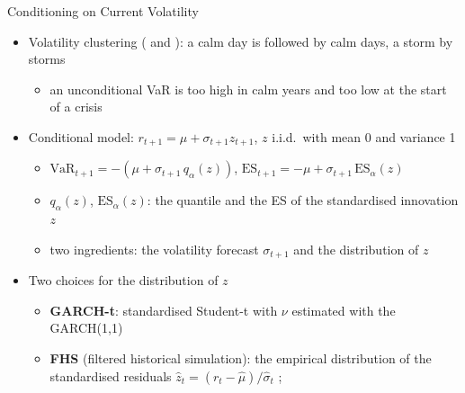 \begin{frame}{Conditioning on Current Volatility}
\itemsize{\footnotesize}
\begin{itemize}
    \item Volatility clustering ( and ): a calm day is followed by calm days, a storm by storms
    \begin{itemize}
        \item an unconditional VaR is too high in calm years and too low at the start of a crisis
    \end{itemize}
    \item Conditional model: $r_{t+1} = \mu + \sigma_{t+1}z_{t+1}$, $z$ i.i.d.\ with mean 0 and variance 1
    \begin{itemize}
        \item $\mathrm{VaR}_{t+1} = -(\mu + \sigma_{t+1}\,q_\alpha(z))$, \quad $\mathrm{ES}_{t+1} = -\mu + \sigma_{t+1}\,\mathrm{ES}_\alpha(z)$
        \item $q_\alpha(z)$, $\mathrm{ES}_\alpha(z)$: the quantile and the ES of the standardised innovation $z$
        \item two ingredients: the volatility forecast $\sigma_{t+1}$ and the distribution of $z$
    \end{itemize}
    \item Two choices for the distribution of $z$
    \begin{itemize}
        \item \textbf{GARCH-t}: standardised Student-t with $\nu$ estimated with the GARCH(1,1) 
        \item \textbf{FHS} (filtered historical simulation): the empirical distribution of the standardised residuals $\hat z_t = (r_t - \hat\mu)/\hat\sigma_t$ ; 
    \end{itemize}
\end{itemize}
\end{frame}

